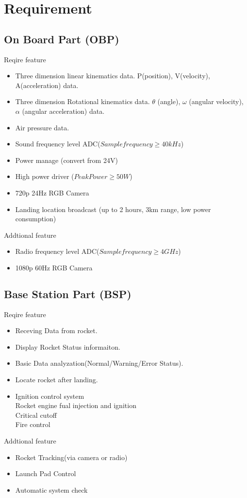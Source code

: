 \documentclass[12pt,article]{memoir}
\begin{document}
\section{Requirement}
\subsection{On Board Part (OBP)}
Reqire feature
\begin{itemize}
\item Three dimension linear kinematics data. P(position), V(velocity), A(acceleration) data.
\item Three dimension Rotational kinematics data. $\theta$ (angle), $\omega$ (angular velocity), $\alpha$ (angular acceleration) data.
\item Air pressure data.
\item Sound frequency level ADC($Sample frequency \geq 40kHz$)
\item Power manage (convert from 24V)
\item High power driver ($Peak Power \geq 50W$)
\item 720p 24Hz RGB Camera 
\item Landing location broadcast (up to 2 hours, 3km range, low power consumption)
\end{itemize}
Addtional feature
\begin{itemize}
\item Radio frequency level ADC($Sample frequency \geq 4GHz$)
\item 1080p 60Hz RGB Camera 
\end{itemize}
\subsection{Base Station Part (BSP)}
Reqire feature
\begin{itemize}
\item Receving Data from rocket.
\item Display Rocket Status informaiton.
\item Basic Data analyzation(Normal/Warning/Error Status).
\item Locate rocket after landing.
\item Ignition control system\\
Rocket engine fual injection and ignition\\
Critical cutoff\\
Fire control\\
\end{itemize}
Addtional feature
\begin{itemize}
\item Rocket Tracking(via camera or radio)
\item Launch Pad Control
\item Automatic system check
\end{itemize}
\end{document}

